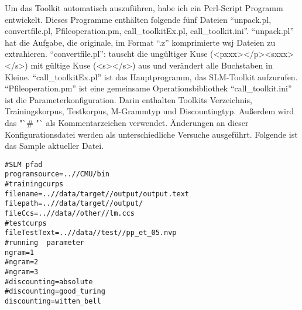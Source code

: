 
Um das Toolkit automatisch auszuf\"uhren, habe ich ein Perl-Script Programm entwickelt. 
Dieses Programme enth\"alten folgende f\"unf Dateien "`unpack.pl, convertfile.pl, Pfileoperation.pm, call\_toolkitEx.pl, call\_toolkit.ini"'.
"`unpack.pl"' hat die Aufgabe, die originale, im Format "`.z"' komprimierte  wsj Dateien zu extrahieren.
"`convertfile.pl"': tauscht die ung\"ultiger Kuse (<pxxx></p><sxxx></s>) mit g\"ultige Kuse (<s></s>) aus und ver\"andert alle Buchstaben in Kleine. 
"`call\_toolkitEx.pl"' ist das Hauptprogramm, das SLM-Toolkit aufzurufen. 
"`Pfileoperation.pm"' ist eine gemeinsame Operationsbibliothek
"`call\_toolkit.ini"' ist die Parameterkonfiguration. Darin enthalten Toolkits Verzeichnis, Trainingskorpus, Testkorpus, M-Grammtyp und Discountingtyp. Au\ss erdem wird das "`\# "`  als Kommentarzeichen verwendet. \"Anderungen an dieser Konfigurationsdatei werden als unterschiedliche Versuche ausgef\"uhrt. Folgende ist das Sample aktueller Datei.

\begin{lstlisting}
#SLM pfad 
programsource=..//CMU/bin 
#trainingcurps 
filename=..//data/target//output/output.text 
filepath=..//data/target//output/ 
fileCcs=..//data//other//lm.ccs 
#testcurps 
fileTestText=..//data//test//pp_et_05.nvp 
#running  parameter 
ngram=1 
#ngram=2 
#ngram=3 
#discounting=absolute 
#discounting=good_turing 
discounting=witten_bell 

\end{lstlisting}
